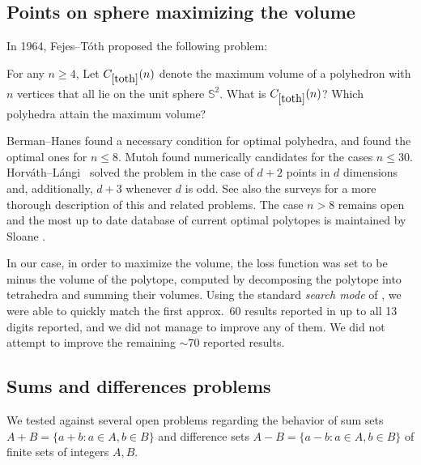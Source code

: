 \subsection{Points on sphere maximizing the volume}

In 1964, Fejes--T{\'o}th
\cite{fejes1964regular} proposed the following problem:

\renewcommand{\problemURL}{https://google-deepmind.github.io/alphaevolve_repository_of_problems/problems/41.html}

\begin{problem}\label{toth}  For any $n \geq 4$, Let $C_{\ref{toth}}(n)$ denote the maximum volume of a polyhedron with $n$ vertices that all lie on the unit sphere ${\mathbb S}^2$.  What is $C_{\ref{toth}}(n)$?  Which polyhedra attain the maximum volume?
\end{problem}

Berman--Hanes \cite{berman1970volumes}
found a necessary condition for optimal polyhedra, and found the optimal ones for $n \leq 8$. Mutoh \cite{mutoh2003polyhedra} found numerically candidates for the cases $n \leq 30$. Horv\'ath--L\'angi~\cite{horvath2016maximum} solved the problem in the case of $d+2$ points in $d$ dimensions and, additionally, $d+3$ whenever $d$ is odd. See also the surveys 
\cite{brass2005,
croft1991unsolved,hardin1995codes} for a more thorough description of this and related problems. The case $n > 8$ remains open and the most up to date database of current optimal polytopes is maintained by Sloane
\cite{sloane1994maximal}.


In our case, in order to maximize the volume, the loss function was set to be minus the volume of the polytope, computed by decomposing the polytope into tetrahedra and summing their volumes. Using the standard \emph{search mode} of \AlphaEvolve, we were able to quickly match the first approx.~60 results  reported in \cite{sloane1994maximal} up to all 13 digits reported, and we did not manage to improve any of them. We did not attempt to improve the remaining $\sim$70 reported results.




\subsection{Sums and differences problems}

We tested \AlphaEvolve against several open problems regarding the behavior of sum sets $A+B = \{a+b: a \in A, b \in B \}$ and difference sets $A-B = \{a-b: a \in A, b \in B \}$ of finite sets of integers $A,B$.

